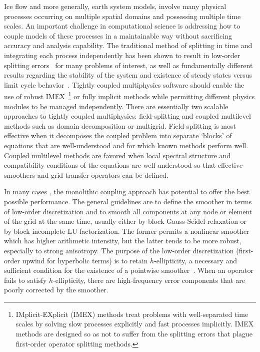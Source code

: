Ice flow and more generally, earth system models, involve many physical processes occurring on multiple spatial domains and possessing multiple time scales.
An important challenge in computational science is addressing how to couple models of these processes in a maintainable way without sacrificing accuracy and analysis capability.
The traditional method of splitting in time and integrating each process independently has been shown to result in low-order splitting errors~\citep{knoll2003bat,mousseau2002inc} for many problems of interest, as well as fundamentally different results regarding the stability of the system \citep{estep2008posteriori} and existence of steady states versus limit cycle behavior~\citep{jardin20081d}.
Tightly coupled multiphysics software should enable the use of robust IMEX~\footnote{IMplicit-EXplicit (IMEX) methods treat problems with well-separated time scales by solving slow processes explicitly and fast processes implicitly. IMEX methods are designed so as not to suffer from the splitting errors that plague first-order operator splitting methods.} or fully implicit methods while permitting different physics modules to be managed independently.
There are essentially two scalable approaches to tightly coupled multiphysics: field-splitting and coupled multilevel methods such as domain decomposition or multigrid.
Field splitting is most effective when it decomposes the coupled problem into separate `blocks' of equations that are well-understood and for which known methods perform well.
Coupled multilevel methods are favored when local spectral structure and compatibility conditions of the equations are well-understood so that effective smoothers and grid transfer operators can be defined.

In many cases \citep{rannacher2000finite,jameson2001many,adams2010toward}, the monolithic coupling approach has potential to offer the best possible performance.
The general guidelines are to define the smoother in terms of low-order discretization and to smooth all components at any node or element of the grid at the same time, usually either by block Gauss-Seidel relaxation or by block incomplete LU factorization.
The former permits a nonlinear smoother which has higher arithmetic intensity, but the latter tends to be more robust, especially to strong anisotropy.
The purpose of the low-order discretization (first-order upwind for hyperbolic terms) is to retain $h$-ellipticity, a necessary and sufficient condition for the existence of a pointwise smoother~\citep{brandt1979multigrid,trottenberg2001multigrid}.
When an operator fails to satisfy $h$-ellipticity, there are high-frequency error components that are poorly corrected by the smoother.

